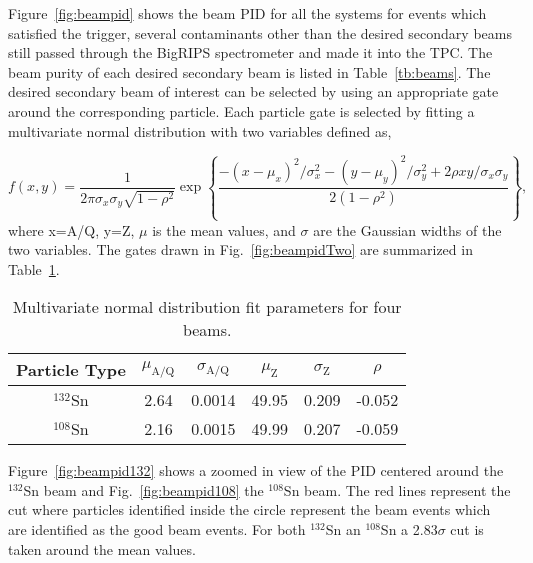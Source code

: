 Figure~\ref{fig:beampid} shows the beam PID for all the systems for events which satisfied the trigger, several contaminants other than the desired secondary beams still passed through the BigRIPS spectrometer and made it into the TPC. The beam purity of each desired secondary beam is listed in Table~\ref{tb:beams}. The desired secondary beam of interest can be selected by using an appropriate gate around the corresponding particle. Each particle gate is selected by fitting a multivariate normal distribution with two variables defined as,

\begin{equation}
  f(x,y)=\frac1{2\pi\sigma_x\sigma_y\sqrt{1-\rho^2}}\exp\left\{
  \frac{-(x - \mu_{x})^2/\sigma_x^2-(y-\mu_{y})^2/\sigma_y^2+2\rho
  xy/\sigma_x\sigma_y}{2(1-\rho^2)}\right\},
   \label{multiGauss}
\end{equation}
where x=A/Q, y=Z, $\mu$ is the mean values, and $\sigma$ are the Gaussian widths of the two variables. The gates drawn in Fig.~\ref{fig:beampidTwo} are summarized in Table~\ref{beamParameters}. 

\begin{table}[!htb]
  \begin{center}
    \begin{tabular}{cccccc}
      \hline 
      Particle Type & $\mu_\mathrm{A/Q}$ & $\sigma_\mathrm{A/Q}$ & $\mu_\mathrm{Z}$ &
      $\sigma_\mathrm{Z}$ & $\rho$\\
      \hline\hline 
      ${}^{132}$Sn & 2.64 & 0.0014 & 49.95 & 0.209 & -0.052 \\
      ${}^{108}$Sn & 2.16 & 0.0015 & 49.99 & 0.207 & -0.059 \\
      \hline
    \end{tabular}
    \caption{Multivariate normal distribution fit parameters for four beams.
    \label{beamParameters}}
  \end{center}
\end{table}

Figure~\ref{fig:beampid132} shows a zoomed in view of the PID centered around the ${}^{132}$Sn beam and Fig.~\ref{fig:beampid108} the ${}^{108}$Sn beam. The red lines represent the cut where particles identified inside the circle represent the beam events which are identified as the good beam events. For both ${}^{132}$Sn an ${}^{108}$Sn a 2.83$\sigma$ cut is taken around the mean values.  


